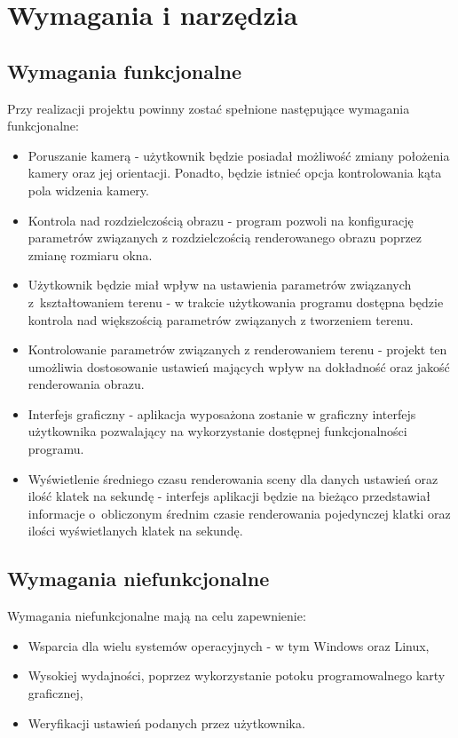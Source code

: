 \chapter{Wymagania i narzędzia}
\label{ch:wymagania-i-narzedzia}

\section{Wymagania funkcjonalne}
Przy realizacji projektu powinny zostać spełnione następujące wymagania funkcjonalne:
\begin{itemize}
\item Poruszanie kamerą -
  użytkownik będzie posiadał możliwość zmiany położenia kamery oraz jej orientacji. Ponadto, będzie istnieć opcja kontrolowania kąta pola widzenia kamery.
\item Kontrola nad rozdzielczością obrazu -
  program pozwoli na konfigurację parametrów związanych z rozdzielczością renderowanego obrazu poprzez zmianę rozmiaru okna.
\item Użytkownik będzie miał wpływ na ustawienia parametrów związanych z~kształtowaniem terenu -
  w trakcie użytkowania programu dostępna będzie kontrola nad większością parametrów związanych z tworzeniem terenu.
\item Kontrolowanie parametrów związanych z renderowaniem terenu -
  projekt ten umożliwia dostosowanie ustawień mających wpływ
  na dokładność oraz jakość renderowania obrazu.
\item Interfejs graficzny -
  aplikacja wyposażona zostanie w graficzny interfejs użytkownika pozwalający na wykorzystanie dostępnej funkcjonalności programu.

\item Wyświetlenie średniego czasu renderowania sceny dla danych ustawień oraz ilość klatek na sekundę -
  interfejs aplikacji będzie na bieżąco przedstawiał informacje o~obliczonym średnim czasie renderowania pojedynczej klatki oraz ilości wyświetlanych klatek na sekundę.

\end{itemize}


\section{Wymagania niefunkcjonalne}
Wymagania niefunkcjonalne mają na celu zapewnienie:
\begin{itemize}
\item Wsparcia dla wielu systemów operacyjnych - w tym Windows oraz Linux,
\item Wysokiej wydajności, poprzez wykorzystanie potoku programowalnego karty graficznej,
\item Weryfikacji ustawień podanych przez użytkownika.
\end{itemize}

